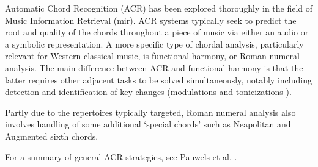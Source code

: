 


Automatic Chord Recognition (ACR) has been explored
thoroughly in the field of Music Information Retrieval
(\gls{mir}). ACR systems typically seek to predict the root and
quality of the chords throughout a piece of music via either
an audio or a symbolic representation. A more specific type
of chordal analysis, particularly relevant for Western
classical music, is functional harmony, or Roman numeral
analysis. The main difference between ACR and functional
harmony is that the latter requires other adjacent tasks to
be solved simultaneously, notably including detection and
identification of key changes (modulations
\parencite{feisthauer2020estimating, schreiber2020local} and
tonicizations \parencite{napoleslopez2020local}).

Partly due to the repertoires typically targeted, Roman
numeral analysis also involves handling of some additional
`special chords' such as Neapolitan and Augmented sixth
chords.

For a summary of general ACR strategies, see Pauwels et al.
\parencite{pauwels201920}.
